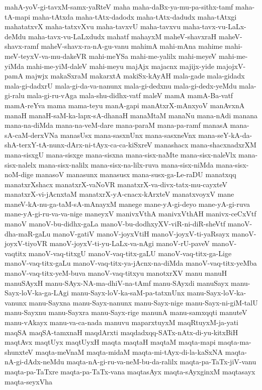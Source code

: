 {mahA-yoV-gi-tavxM-samx-yaRteV
maha
maha-daBx-ya-mu-pa-sithx-tamf
maha-tA-mapi
maha-tAtxda
maha-tAtx-dadodx
maha-tAtx-dadudx
maha-tAtxgi
mahatatxvX
maha-tatxvXvu
maha-tavxvU
maha-tavxvu
maha-tavx-vu-LaLx-deMdu
maha-tavx-vu-LaLxdudx
mahatf
mahayxM
maheV-shavxraH
maheV-shavx-ramf
maheV-shavx-ra-nA-gu-vanu
mahimA
mahi-mAna
mahime
mahi-meV-teyxV-va-mu-dakeVR
mahi-meYSa
mahi-me-yalilx
mahi-meyeV
mahi-me-yiMda
mahi-me-yiM-daleV
mahi-meyu
majAjx
majacnx
majijx-yide
majojxV-pamA
majwjx
makaSxraM
makarxtA
makiSx-kAyAH
mala-gade
mala-gidadx
mala-gi-dadxrU
mala-gi-da-va-nanunx
mala-gi-dedxnu
mala-gi-dedx-yeMdu
mala-gi-ralu
mala-gi-ru-vAga
mala-shu-didhx-vatf
maleV
mamA
mamA-Ba-vatf
mamA-reYva
mama
mama-teyu
manA-gapi
manAtxrX-mAnxyoV
manAvxnA
manaH
manaH-saM-ka-lapx-sA-dhanaH
manaMtaM
manaNu
mana-nAdi
manana
mana-na-diMda
mana-na-veM-dare
mana-paraM
mana-pa-ramf
manasA
mana-sA-caM-derxVNa
manasUsx
mana-sasxnUnx
mana-sasxneVnx
mana-seY-kA-da-shA-terxY-tA-nunx-dArx-ni-tAyx-ca-ca-kiSxreV
manashacx
mana-shacxnadxrXM
mana-sisxgU
mana-sisxge
mana-sisxna
mana-sisx-naMte
mana-sisx-naleVlx
mana-sisx-nalelx
mana-sisx-nalilx
mana-sisx-na-lilx-ruva
mana-sisx-niMda
mana-sisx-noM-dige
manasoV
manasunx
manasusx
mana-susx-ga-Le-raDU
manatxqq
manatxrXshacx
manatxrX-vaNoVR
manatxrX-va-divx-tatx-mu-cayxteV
manatxrX-vi-jAcnxtaM
manatxrX-yA-cnacx-kArxteV
manatxvoyxV
mane
maneV-kA-nu-ga-taM-sA-mAnayxM
manege
mane-yA-gi-deyo
mane-yA-gi-ruva
mane-yA-gi-ru-va-va-nige
maneyxV
manivxVthA
manivxVthAH
manivx-ceCxVtf
manoV
manoV-bu-didhx-gaLa
manoV-bu-dodhxyXV-viR-ni-diR-sheVtf
manoV-dha-maR-gaLu
manoV-gatiV
manoV-joyxVtiH
manoV-joyxV-ti-yaRsayx
manoV-joyxV-tiyoVR
manoV-joyxV-ti-yu-LaLx-va-nAgi
manoV-rU-paveV
manoV-vaqtitx
manoV-vaq-titxgU
manoV-vaq-titx-gaLU
manoV-vaq-titx-ga-Lige
manoV-vaq-titx-gaLu
manoV-vaq-titx-ya-jAcnx-na-diMda
manoV-vaq-titx-yeMba
manoV-vaq-titx-yeM-buva
manoV-vaq-titxyu
manotxrXV
manu
manuH
manuSAyxH
manu-SAyx-NA-ma-dhiV-na-tAmf
manu-SAyxdi
manuSayx
manu-Sayx-loV-ka-ga-LAgi
manu-Sayx-loV-ka-saM-pa-tatxnUnx
manu-Sayx-loV-ka-vanunx
manu-Sayxna
manu-Sayx-nanunx
manu-Sayx-nige
manu-Sayx-ni-giM-talU
manu-Sayxnu
manu-Sayxra
manu-Sayx-rige
manunA
manu-samxqqti
manuteV
manu-vAkayx
manu-va-ca-nada
manuvu
maparxtuyxM
maqRtuyxM-ja-yati
maqSA
maqSA-tamxnaH
maqdArxti
maqdadxqq-SATx-nAtx-di-yu-kitxBiH
maqtAvx
maqtUyx
maqtUyxH
maqta
maqtaH
maqtaM
maqta-mapi
maqta-ma-shunxteV
maqta-meVnaM
maqta-midaM
maqta-mi-tAyx-di-la-kaSxNA
maqta-nA-gi-dAdx-neMdu
maqta-nA-gi-ru-va-neM-bu-da-ralilx
maqta-pa-TaTx-jiV-vanu
maqta-pa-TaTxre
maqta-pa-TaTx-vana
maqtasAyx
maqta-sAyxginxM
maqtasayx
maqta-seyxVha
}
